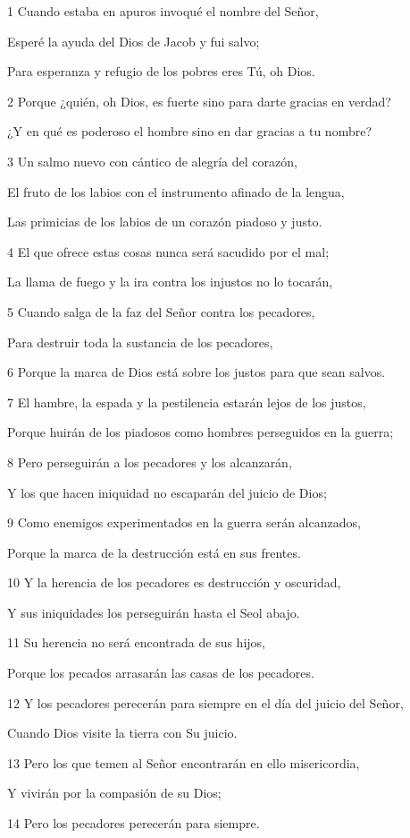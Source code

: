 \par 1 Cuando estaba en apuros invoqué el nombre del Señor,
\par     Esperé la ayuda del Dios de Jacob y fui salvo;
\par     Para esperanza y refugio de los pobres eres Tú, oh Dios.
\par 2 Porque ¿quién, oh Dios, es fuerte sino para darte gracias en verdad?
\par     ¿Y en qué es poderoso el hombre sino en dar gracias a tu nombre?
\par 3 Un salmo nuevo con cántico de alegría del corazón,
\par     El fruto de los labios con el instrumento afinado de la lengua,
\par     Las primicias de los labios de un corazón piadoso y justo.
\par 4 El que ofrece estas cosas nunca será sacudido por el mal;
\par     La llama de fuego y la ira contra los injustos no lo tocarán,
\par 5 Cuando salga de la faz del Señor contra los pecadores,
\par     Para destruir toda la sustancia de los pecadores,
\par 6 Porque la marca de Dios está sobre los justos para que sean salvos.
\par   
\par 7 El hambre, la espada y la pestilencia estarán lejos de los justos,
\par     Porque huirán de los piadosos como hombres perseguidos en la guerra;
\par 8 Pero perseguirán a los pecadores y los alcanzarán,
\par     Y los que hacen iniquidad no escaparán del juicio de Dios;
\par 9 Como enemigos experimentados en la guerra serán alcanzados,
\par     Porque la marca de la destrucción está en sus frentes.
\par 10 Y la herencia de los pecadores es destrucción y oscuridad,
\par     Y sus iniquidades los perseguirán hasta el Seol abajo.
\par 11 Su herencia no será encontrada de sus hijos,
\par     Porque los pecados arrasarán las casas de los pecadores.
\par 12 Y los pecadores perecerán para siempre en el día del juicio del Señor,
\par     Cuando Dios visite la tierra con Su juicio.
\par 13 Pero los que temen al Señor encontrarán en ello misericordia,
\par     Y vivirán por la compasión de su Dios;
\par 14 Pero los pecadores perecerán para siempre.




